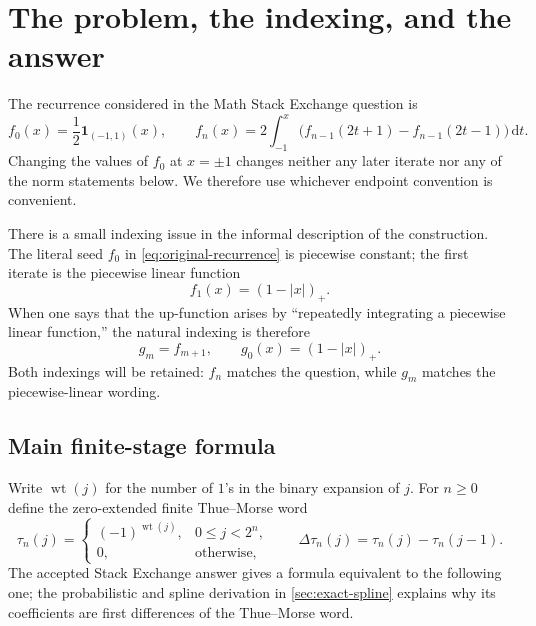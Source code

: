 \documentclass[11pt,oneside]{article}
\theoremstyle{definition}
\theoremstyle{remark}
\newcommand{\ind}{\mathbf 1}
\newcommand{\wt}{\operatorname{wt}}
\newcommand{\dd}{\,\mathrm d}
\newcommand{\pos}[1]{\left(#1\right)_{+}}
\begin{document}
\tableofcontents
\newpage

\section{The problem, the indexing, and the answer}
\label{sec:introduction}

The recurrence considered in the Math Stack Exchange question
\cite{mse-question,mse-answer} is
\begin{equation}
 f_0(x)=\frac12\ind_{(-1,1)}(x),
 \qquad
 f_n(x)=2\int_{-1}^{x}
 \bigl(f_{n-1}(2t+1)-f_{n-1}(2t-1)\bigr)\dd t.
 \label{eq:original-recurrence}
\end{equation}
Changing the values of $f_0$ at $x=\pm1$ changes neither any later iterate nor any of the
norm statements below.  We therefore use whichever endpoint convention is convenient.

There is a small indexing issue in the informal description of the construction.  The
literal seed $f_0$ in \eqref{eq:original-recurrence} is piecewise constant; the first iterate
is the piecewise linear function
\begin{equation}
 f_1(x)=\pos{1-|x|}.
 \label{eq:tent}
\end{equation}
When one says that the up-function arises by ``repeatedly integrating a piecewise linear
function,'' the natural indexing is therefore
\begin{equation}
 g_m=f_{m+1},\qquad g_0(x)=\pos{1-|x|}.
 \label{eq:linear-indexing}
\end{equation}
Both indexings will be retained: $f_n$ matches the question, while $g_m$ matches the
piecewise-linear wording.

\subsection{Main finite-stage formula}

Write $\wt(j)$ for the number of $1$'s in the binary expansion of $j$.  For $n\ge0$ define
the zero-extended finite Thue--Morse word
\begin{equation}
 \tau_n(j)=
 \begin{cases}
  (-1)^{\wt(j)},&0\le j<2^n,\\
  0,&\text{otherwise},
 \end{cases}
 \qquad
 \Delta\tau_n(j)=\tau_n(j)-\tau_n(j-1).
 \label{eq:tau-definition}
\end{equation}
The accepted Stack Exchange answer gives a formula equivalent to the following one; the
probabilistic and spline derivation in \cref{sec:exact-spline} explains why its coefficients
are first differences of the Thue--Morse word.
\end{document}
